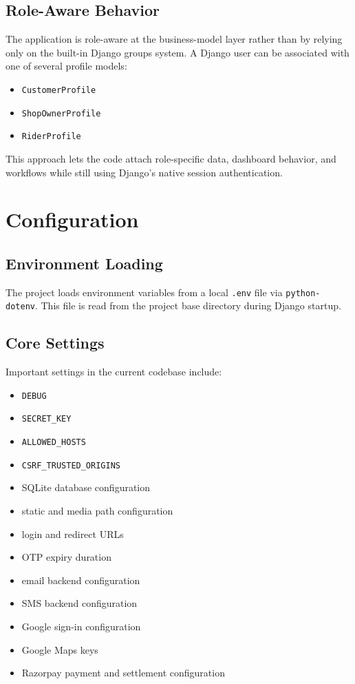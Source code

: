 \documentclass[12pt,a4paper]{article}
\begin{document}
\subsection{Role-Aware Behavior}
The application is role-aware at the business-model layer rather than by relying only on the built-in Django groups system. A Django user can be associated with one of several profile models:
\begin{itemize}[leftmargin=1.5em]
    \item \texttt{CustomerProfile}
    \item \texttt{ShopOwnerProfile}
    \item \texttt{RiderProfile}
\end{itemize}

This approach lets the code attach role-specific data, dashboard behavior, and workflows while still using Django's native session authentication.

\section{Configuration}
\subsection{Environment Loading}
The project loads environment variables from a local \texttt{.env} file via \texttt{python-dotenv}. This file is read from the project base directory during Django startup.

\subsection{Core Settings}
Important settings in the current codebase include:
\begin{itemize}[leftmargin=1.5em]
    \item \texttt{DEBUG}
    \item \texttt{SECRET\_KEY}
    \item \texttt{ALLOWED\_HOSTS}
    \item \texttt{CSRF\_TRUSTED\_ORIGINS}
    \item SQLite database configuration
    \item static and media path configuration
    \item login and redirect URLs
    \item OTP expiry duration
    \item email backend configuration
    \item SMS backend configuration
    \item Google sign-in configuration
    \item Google Maps keys
    \item Razorpay payment and settlement configuration
\end{itemize}
\end{document}
